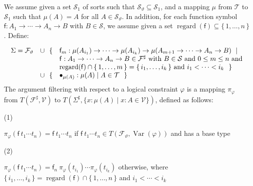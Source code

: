 We assume given a set $\mathcal{S}_{1}$ of sorts such that ${\mathcal{S}}_{\vartheta}\subseteq\mathcal{S}_{1}$, and a mapping $\mu$ from $\mathcal{T}$ to $\mathcal{S}_{1}$ such that $\mu(A)=A$ for all $A\in{\mathcal{S}}_{\vartheta}$. In addition, for each function symbol $\mathsf{f}:{A}_{1}\rightarrow\cdots\rightarrow{A}_{n}\rightarrow B$ with $B\in\mathcal{S}$, we assume given a set $\operatorname{regard}(\mathsf{f})\subseteq\{\,1,\ldots,n\,\}$. Define:\par
    \[\begin{array}[]{rcl}\Sigma={\mathcal{F}}_{\vartheta}&\cup\ \ \{&\mathsf{f}_{m}:\mu(A_{i_{1}})\rightarrow\dots\rightarrow\mu(A_{i_{k}})\rightarrow\mu(A_{m+1}\rightarrow\dots\rightarrow A_{n}\rightarrow B)\ \mid\\
&&\mathsf{f}:{A}_{1}\rightarrow\cdots\rightarrow{A}_{n}\rightarrow B\in\mathcal{F}^{\sharp}\ \text{with}\ B\in\mathcal{S}\ \text{and}\ 0\leq m\leq n\ \text{and}\\
&&\operatorname{regard}(\mathsf{f})\cap\{\,1,\ldots,m\,\}=\{\,{i}_{1},\ldots,{i}_{k}\,\}\ \text{and}\ {i}_{1}<\cdots<{i}_{k}\ \ \}\\
&\cup\ \ \{&\bullet_{\mu(A)}:\mu(A)\mid A\in\mathcal{T}\ \ \}\\
\end{array}\]    
The argument filtering with respect to a logical constraint $\varphi$ is a mapping $\pi_{\varphi}$ from $T(\mathcal{F}^{\sharp},\mathcal{V})$ to $T(\Sigma^{\sharp},\{x:\mu(A)\mid x:A\in\mathcal{V}\})$, defined as follows:\par
  
\par\noindent  (1) 
 
$\pi_{\varphi}({\mathsf{f}}\ {{t}_{1}\cdots{t}_{n}})={\mathsf{f}}\ {{t}_{1}\cdots{t}_{n}}$ if ${\mathsf{f}}\ {{t}_{1}\cdots{t}_{n}}\in T({\mathcal{F}}_{\vartheta},\operatorname{Var}(\varphi))$ and has a base type\par
 
 
 
\par\noindent  (2) 
 
$\pi_{\varphi}({\mathsf{f}}\ {{t}_{1}\cdots{t}_{n}})={\mathsf{f}_{n}}\ {\pi_{\varphi}(t_{i_{1}})\cdots\pi_{\varphi}(t_{i_{k}})}$ otherwise, where $\{\,{i}_{1},\ldots,{i}_{k}\,\}=\operatorname{regard}(\mathsf{f})\cap\{\,1,\ldots,n\,\}$ and ${i}_{1}<\cdots<{i}_{k}$\par
 
